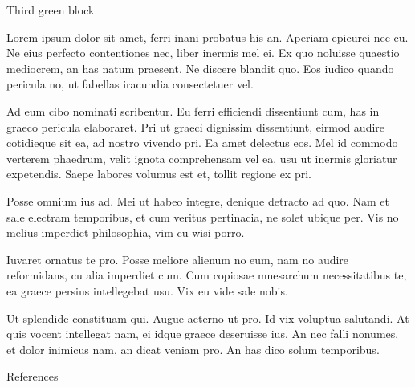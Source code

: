 \documentclass[final]{beamer}
\begin{document}
\begin{frame}{}
\begin{columns}[t]
\begin{column}{.3\linewidth}
\begin{problockGreen}{Third green block}

Lorem ipsum dolor sit amet, ferri inani probatus his an. Aperiam epicurei nec cu. Ne eius perfecto contentiones nec, liber inermis mel ei. Ex quo noluisse quaestio mediocrem, an has natum praesent. Ne discere blandit quo. Eos iudico quando pericula no, ut fabellas iracundia consectetuer vel.

Ad eum cibo nominati scribentur. Eu ferri efficiendi dissentiunt cum, has in graeco pericula elaboraret. Pri ut graeci dignissim dissentiunt, eirmod audire cotidieque sit ea, ad nostro vivendo pri. Ea amet delectus eos. Mel id commodo verterem phaedrum, velit ignota comprehensam vel ea, usu ut inermis gloriatur expetendis. Saepe labores volumus est et, tollit regione ex pri.

Posse omnium ius ad. Mei ut habeo integre, denique detracto ad quo. Nam et sale electram temporibus, et cum veritus pertinacia, ne solet ubique per. Vis no melius imperdiet philosophia, vim cu wisi porro.

Iuvaret ornatus te pro. Posse meliore alienum no eum, nam no audire reformidans, cu alia imperdiet cum. Cum copiosae mnesarchum necessitatibus te, ea graece persius intellegebat usu. Vix eu vide sale nobis.

Ut splendide constituam qui. Augue aeterno ut pro. Id vix voluptua salutandi. At quis vocent intellegat nam, ei idque graece deseruisse ius. An nec falli nonumes, et dolor inimicus nam, an dicat veniam pro. An has dico solum temporibus.

\end{problockGreen}

\begin{block}{References}

{
}		%




\end{block}
\end{column}
\end{columns}
\end{frame}
\end{document}
